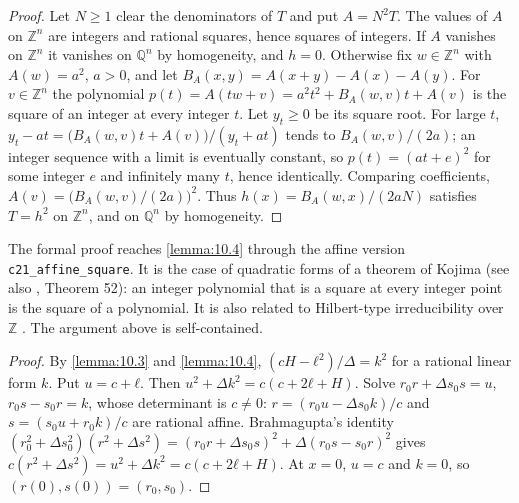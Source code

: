 \begin{proof}
Let $N ≥ 1$ clear the denominators of $T$ and put $A = N^{2}T$. The values of $A$ on $ℤ^{n}$ are integers and rational squares, hence squares of integers. If $A$ vanishes on $ℤ^{n}$ it vanishes on $ℚ^{n}$ by homogeneity, and $h = 0$. Otherwise fix $w ∈ ℤ^{n}$ with $A(w) = a^{2}$, $a > 0$, and let $B_{A}(x, y) = A(x + y) - A(x) - A(y)$. For $v ∈ ℤ^{n}$ the polynomial $p(t) = A(tw + v) = a^{2}t^{2} + B_{A}(w, v)t + A(v)$ is the square of an integer at every integer $t$. Let $y_{t} ≥ 0$ be its square root. For large $t$, $y_{t} - at = \big(B_{A}(w, v)t + A(v)\big)/(y_{t} + at)$ tends to $B_{A}(w, v)/(2a)$; an integer sequence with a limit is eventually constant, so $p(t) = (at + e)^{2}$ for some integer $e$ and infinitely many $t$, hence identically. Comparing coefficients, $A(v) = \big(B_{A}(w, v)/(2a)\big)^{2}$. Thus $h(x) = B_{A}(w, x)/(2aN)$ satisfies $T = h^{2}$ on $ℤ^{n}$, and on $ℚ^{n}$ by homogeneity.
\end{proof}

The formal proof reaches \cref{lemma:10.4} through the affine version \texttt{c21\_affine\_square}. It is the case of quadratic forms of a theorem of Kojima \cite{Koj15} (see also \cite{Sch00}, Theorem 52): an integer polynomial that is a square at every integer point is the square of a polynomial. It is also related to Hilbert-type irreducibility over $ℤ$ \cite{BDKN22}. The argument above is self-contained.


\begin{proof}
By \cref{lemma:10.3} and \cref{lemma:10.4}, $(cH - ℓ^{2})/Δ = k^{2}$ for a rational linear form $k$. Put $u = c + ℓ$. Then $u^{2} + Δk^{2} = c(c + 2ℓ + H)$. Solve $r_{0}r + Δs_{0}s = u$, $r_{0}s - s_{0}r = k$, whose determinant is $c ≠ 0$: $r = (r_{0}u - Δs_{0}k)/c$ and $s = (s_{0}u + r_{0}k)/c$ are rational affine. Brahmagupta's identity $(r_{0}^{2} + Δs_{0}^{2})(r^{2} + Δs^{2}) = (r_{0}r + Δs_{0}s)^{2} + Δ(r_{0}s - s_{0}r)^{2}$ gives $c(r^{2} + Δs^{2}) = u^{2} + Δk^{2} = c(c + 2ℓ + H)$. At $x = 0$, $u = c$ and $k = 0$, so $(r(0), s(0)) = (r_{0}, s_{0})$.
\end{proof}

